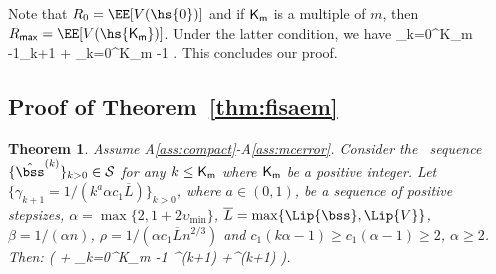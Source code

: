 \documentclass[11pt]{article}
\makeatletter
\newtheorem*{Theorem*}{Theorem}
\renewenvironment{proof}[1][\proofname]{%
   \par\pushQED{\qed}\normalfont%
   \topsep6\p@\@plus6\p@\relax
   \trivlist\item[\hskip\labelsep\bfseries#1]%
   \ignorespaces
}{%
   \popQED\endtrivlist\@endpefalse
}
\theoremstyle{t}
\makeatother
\begin{document}
\begin{proof}
Note that $R_0 = \EE[ V( \hs{0} ) ]$ and if ${\sf K}_{\sf m }$ is a multiple of $m$, then $R_{\sf max} = \EE[ V( \hs{{\sf K}_{\sf m }}) ]$. Under the latter condition, we have
\beq\notag
 \sum_{k=0}^{{\sf K}_{\sf m }-1}\gamma_{k+1} \EE[ \| \grd V( \hs{k} ) \|^2 ] \leq {}\EE[ V( \hs{0} ) - V( \hs{{\sf K}_{\sf m }}) ] +  \sum_{k=0}^{{\sf K}_{\sf m }-1} \eqsp.
\eeq
This concludes our proof.

\end{proof}


\subsection{Proof of Theorem~\ref{thm:fisaem}}\label{app:theoremfisaem}
\begin{Theorem*}
Assume A\ref{ass:compact}-A\ref{ass:mcerror}.
Consider the \FISAEM\ sequence $\{\hat{\bss}^{(k)}\}_{k>0} \in \mathcal{S}$ for any $k \leq {\sf K}_{\sf m }$ where ${\sf K}_{\sf m }$ be a positive integer.
Let $\{\gamma_{k+1} = 1/(k^a \alpha c_1 \overline{L}) \}_{k>0}$, where $a \in (0,1)$, be a sequence of positive stepsizes, $\alpha =\max\{2, 1+2\upsilon_{\min}\}$, $\overline{L} = \max\{ \Lip{\bss} , \Lip{V} \}$, $\beta = 1/(\alpha n)$, $\rho = 1/(\alpha c_1 \overline{L}n^{2/3})$ and $c_1(k\alpha-1) \geq c_1(\alpha-1) \geq 2$, $\alpha \geq 2$. Then:
\beq\notag
 \EE[ \| \grd V( \hs{K} ) \|^2 ] \leq {} \left( \EE {}   + \sum_{k=0}^{{\sf K}_{\sf m }-1}  \Xi^{(k+1)}  +\Gamma^{(k+1)} \EE [\| \hs{k} - \tilde{S}^{(k)}\|^2 ]\right)\eqs.
\eeq
\end{Theorem*} 
\end{document}
